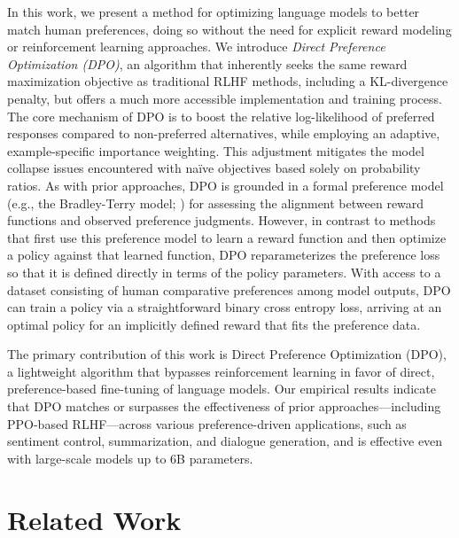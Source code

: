In this work, we present a method for optimizing language models to better match human preferences, doing so without the need for explicit reward modeling or reinforcement learning approaches. We introduce \textit{{Direct Preference Optimization} (DPO)}, an algorithm that inherently seeks the same reward maximization objective as traditional RLHF methods, including a KL-divergence penalty, but offers a much more accessible implementation and training process. The core mechanism of DPO is to boost the relative log-likelihood of preferred responses compared to non-preferred alternatives, while employing an adaptive, example-specific importance weighting. This adjustment mitigates the model collapse issues encountered with naïve objectives based solely on probability ratios. As with prior approaches, DPO is grounded in a formal preference model (e.g., the Bradley-Terry model; \cite{bradley1952rankanalysis}) for assessing the alignment between reward functions and observed preference judgments. However, in contrast to methods that first use this preference model to learn a reward function and then optimize a policy against that learned function, DPO reparameterizes the preference loss so that it is defined directly in terms of the policy parameters. With access to a dataset consisting of human comparative preferences among model outputs, DPO can train a policy via a straightforward binary cross entropy loss, arriving at an optimal policy for an implicitly defined reward that fits the preference data.

The primary contribution of this work is Direct Preference Optimization (DPO), a lightweight algorithm that bypasses reinforcement learning in favor of direct, preference-based fine-tuning of language models. Our empirical results indicate that DPO matches or surpasses the effectiveness of prior approaches—including PPO-based RLHF—across various preference-driven applications, such as sentiment control, summarization, and dialogue generation, and is effective even with large-scale models up to 6B parameters.

\section{Related Work}

